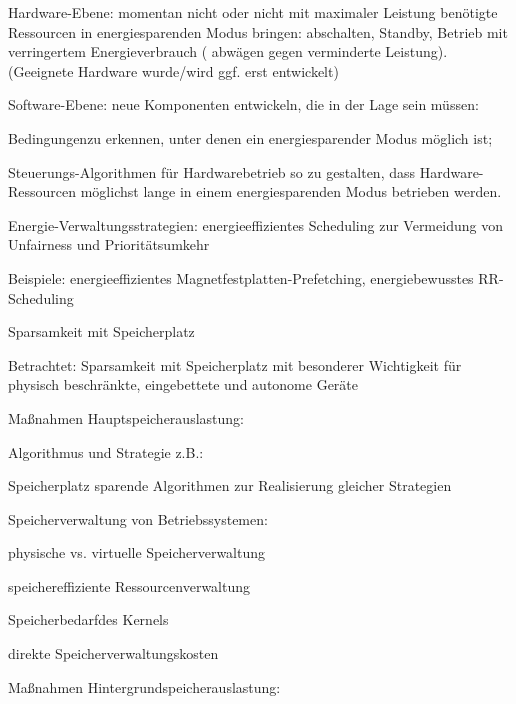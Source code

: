 \documentclass[a4paper]{article}
\begin{document}
\begin{multicols}{3}
    \begin{enumerate*}
        \item Hardware-Ebene: momentan nicht oder nicht mit maximaler Leistung
        benötigte Ressourcen in energiesparenden Modus bringen: abschalten,
        Standby, Betrieb mit verringertem Energieverbrauch ( abwägen gegen
        verminderte Leistung). (Geeignete Hardware wurde/wird ggf. erst
        entwickelt)
        \item Software-Ebene: neue Komponenten entwickeln, die in der Lage sein
        müssen:
        \begin{itemize*}
            \item Bedingungenzu erkennen, unter denen ein energiesparender Modus möglich ist;
            \item Steuerungs-Algorithmen für Hardwarebetrieb so zu gestalten, dass Hardware-Ressourcen möglichst lange in einem energiesparenden Modus betrieben werden.
            \item Energie-Verwaltungsstrategien: energieeffizientes Scheduling zur Vermeidung von Unfairness und Prioritätsumkehr
            \item Beispiele: energieeffizientes Magnetfestplatten-Prefetching, energiebewusstes RR-Scheduling
        \end{itemize*}
    \end{enumerate*}

    Sparsamkeit mit Speicherplatz

    \begin{itemize*}
        \item Betrachtet: Sparsamkeit mit Speicherplatz mit besonderer Wichtigkeit
        für physisch beschränkte, eingebettete und autonome Geräte
        \item Maßnahmen Hauptspeicherauslastung:
        \begin{enumerate*}

            \item Algorithmus und Strategie z.B.: \begin{itemize*} \item Speicherplatz sparende Algorithmen zur Realisierung gleicher Strategien \end{itemize*}
            \item Speicherverwaltung von Betriebssystemen: \begin{itemize*} \item physische vs. virtuelle Speicherverwaltung \item speichereffiziente Ressourcenverwaltung \item Speicherbedarfdes Kernels \item direkte Speicherverwaltungskosten \end{itemize*}
        \end{enumerate*}
        \item Maßnahmen Hintergrundspeicherauslastung:
        \begin{enumerate*}


\end{enumerate*}
\end{itemize*}
\end{multicols}
\end{document}
